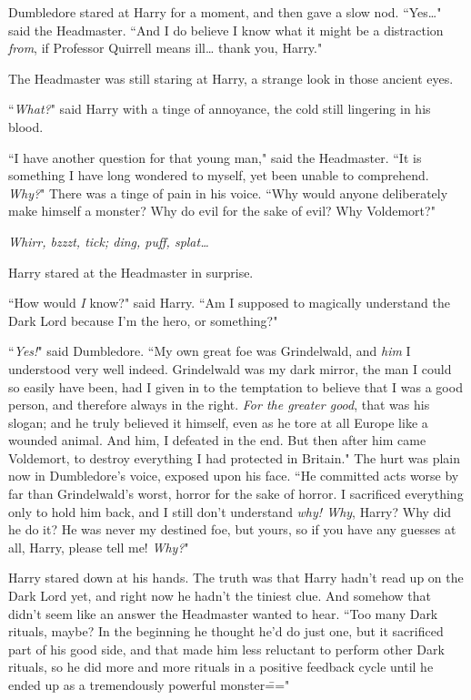 Dumbledore stared at Harry for a moment, and then gave a slow nod. ``Yes{\ldots}" said the Headmaster. ``And I do believe I know what it might be a distraction \emph{from}, if Professor Quirrell means ill{\ldots} thank you, Harry."

The Headmaster was still staring at Harry, a strange look in those ancient eyes.

``\emph{What?}" said Harry with a tinge of annoyance, the cold still lingering in his blood.

``I have another question for that young man," said the Headmaster. ``It is something I have long wondered to myself, yet been unable to comprehend. \emph{Why?}" There was a tinge of pain in his voice. ``Why would anyone deliberately make himself a monster? Why do evil for the sake of evil? Why Voldemort?"

\later

\emph{Whirr, bzzzt, tick; ding, puff, splat{\ldots}}

Harry stared at the Headmaster in surprise.

``How would \emph{I} know?" said Harry. ``Am I supposed to magically understand the Dark Lord because I'm the hero, or something?"

``\emph{Yes!}" said Dumbledore. ``My own great foe was Grindelwald, and \emph{him} I understood very well indeed. Grindelwald was my dark mirror, the man I could so easily have been, had I given in to the temptation to believe that I was a good person, and therefore always in the right. \emph{For the greater good}, that was his slogan; and he truly believed it himself, even as he tore at all Europe like a wounded animal. And him, I defeated in the end. But then after him came Voldemort, to destroy everything I had protected in Britain." The hurt was plain now in Dumbledore's voice, exposed upon his face. ``He committed acts worse by far than Grindelwald's worst, horror for the sake of horror. I sacrificed everything only to hold him back, and I still don't understand \emph{why! Why}, Harry? Why did he do it? He was never my destined foe, but yours, so if you have any guesses at all, Harry, please tell me! \emph{Why?}"

Harry stared down at his hands. The truth was that Harry hadn't read up on the Dark Lord yet, and right now he hadn't the tiniest clue. And somehow that didn't seem like an answer the Headmaster wanted to hear. ``Too many Dark rituals, maybe? In the beginning he thought he'd do just one, but it sacrificed part of his good side, and that made him less reluctant to perform other Dark rituals, so he did more and more rituals in a positive feedback cycle until he ended up as a tremendously powerful monster\==="

